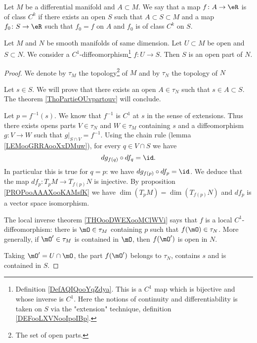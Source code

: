\begin{definition}	\label{DEFooLXVNooIpoIBp}
	Let \( M\) be a differential manifold and \( A\subset M\). We say that a map \(f \colon A\to \eR  \) is of class \( C^k\) if there exists an open \( S\) such that \( A\subset S\subset M\) and a map \(f_0 \colon S\to \eR  \) such that \( f_0=f\) on \( A\) and \( f_0\) is of class \( C^k\) on \( S\).
\end{definition}

\begin{theorem}	\label{THOooGUELooSBQhRu}
	Let \( M\) and \( N\) be smooth manifolds of same dimension. Let \( U\subset M\) be open and \( S\subset N\). We consider a \( C^1\)-diffeomorphism\footnote{Definition \ref{DefAQIQooYqZdya}. This is a \( C^1\) map which is bijective and whose inverse is \( C^1\). Here the notions of continuity and differentiability is taken on \( S\) via the "extension" technique, definition \ref{DEFooLXVNooIpoIBp}.} \(f \colon U\to S  \). Then \( S\) is an open part of \( N\).
\end{theorem}

\begin{proof}
	We denote by \( \tau_M\) the topology\footnote{The set of open parts.} of \( M\) and by \( \tau_N\) the topology of $N$

	Let \( s\in S\). We will prove that there exists an open \( A\in \tau_N\) such that \( s\in A\subset S\). The theorem \ref{ThoPartieOUvpartouv} will conclude.

	Let \( p=f^{-1}(s)\). We know that \( f^{-1}\) is \( C^1\) at \( s\) in the sense of extensions. Thus there exists opens parts \( V\in\tau_N\) and \( W\in\tau_M\) containing \( s\) and a diffeomorphism \(g \colon V\to W  \) such that \( g|_{S\cap V}=f^{-1}\). Using the chain rule (lemma \ref{LEMooGRRAooXxDMuw}), for every \( q\in V\cap S\) we have
	\begin{equation}
		dg_{f(q)}\circ df_q=\id.
	\end{equation}
	In particular this is true for \( q=p\): we have \( dg_{f(p)}\circ df_p=\id\). We deduce that the map \(df_p \colon T_pM\to T_{f(p)}N  \) is injective. By proposition \ref{PROPooAAAXooKAMsfK} we have \( \dim(T_pM)=\dim(T_{f(p)}N)\) and \( df_p\) is a vector space isomorphism.

	The local inverse theorem \ref{THOooDWEXooMClWVi} says that \( f\) is a local \( C^1\)-diffeomorphism: there is \( \mO\in\tau_M\) containing \( p\) such that \( f(\mO)\in\tau_N\). More generally, if \( \mO'\in \tau_M\) is contained in \( \mO\), then \( f(\mO')\) is open in \( N\).

	Taking \( \mO'=U\cap\mO\), the part \( f(\mO')\) belongs to \( \tau_N\), contains \( s\) and is contained in \( S\).
\end{proof}

